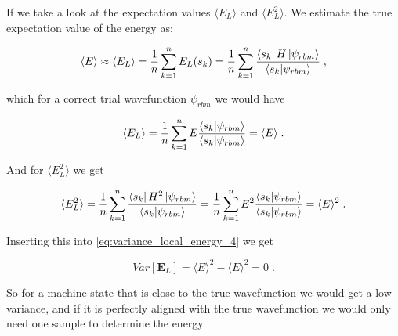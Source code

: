 If we take a look at the expectation values $\langle E_L\rangle$ and $\langle E_L^2 \rangle$. We estimate the true expectation value of the energy as:

\begin{equation}
  \langle E \rangle \approx  \langle E_L \rangle = \displaystyle\frac{1}{n}\displaystyle\sum_{k=1}^{n} E_L(s_k) = \displaystyle\frac{1}{n}\displaystyle\sum_{k=1}^{n} \displaystyle\frac{\bra{s_k}H\ket{\psi_{rbm}}}{\braket{s_k}{\psi_{rbm}}}\; ,
  \label{eq:variance_true}
\end{equation}

which for a correct trial wavefunction $\psi_{rbm}$ we would have

\begin{equation}
  \langle E_L \rangle = \displaystyle\frac{1}{n}\displaystyle\sum_{k=1}^{n}E \displaystyle\frac{\braket{s_k}{\psi_{rbm}}}{\braket{s_k}{\psi_{rbm}}}  = \langle E\rangle\; .
  \label{eq:variance_true_true}
\end{equation}

And for $\langle E_L^2\rangle$ we get

\begin{equation}
  \langle E_L^2 \rangle = \displaystyle\frac{1}{n}\displaystyle\sum_{k=1}^{n} \displaystyle\frac{\bra{s_k}H^2\ket{\psi_{rbm}}}{\braket{s_k}{\psi_{rbm}}} = \displaystyle\frac{1}{n}\displaystyle\sum_{k=1}^{n}E^2 \displaystyle\frac{\braket{s_k}{\psi_{rbm}}}{\braket{s_k}{\psi_{rbm}}} = \langle E\rangle^2\; .
  \label{eq:variance_true_squared}
\end{equation}

Inserting this into \ref{eq:variance_local_energy_4} we get

\begin{equation}
  Var[\boldsymbol{E}_L] = \langle E\rangle^2 -\langle E\rangle^2 = 0 \; .
  \label{eq:variance_final}
\end{equation}

So for a machine state that is close to the true wavefunction we would get a low variance, and if it is perfectly aligned with the true wavefunction we would only need one sample to determine the energy.
